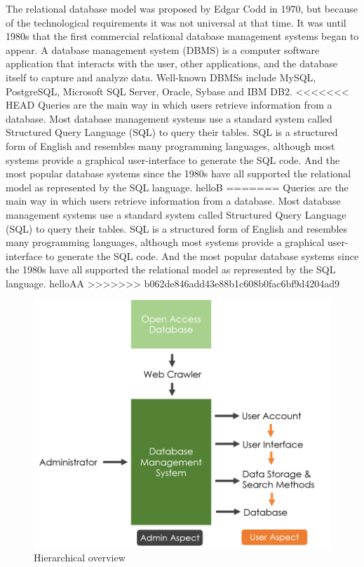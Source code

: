 The relational database model was proposed by Edgar Codd in 1970, but because of the technological requirements it was not universal at that time. It was until 1980s that the first commercial relational database management systems began to appear. 
A database management system (DBMS) is a computer software application that interacts with the user, other applications, and the database itself to capture and analyze data. Well-known DBMSs include MySQL, PostgreSQL, Microsoft SQL Server, Oracle, Sybase and IBM DB2. 
<<<<<<< HEAD
Queries are the main way in which users retrieve information from a database. Most database management systems use a standard system called Structured Query Language (SQL) to query their tables. SQL is a structured form of English and resembles many programming languages, although most systems provide a graphical user-interface to generate the SQL code. And the most popular database systems since the 1980s have all supported the relational model as represented by the SQL language.\cite{Martinez-Cruz2011} helloB	
=======
Queries are the main way in which users retrieve information from a database. Most database management systems use a standard system called Structured Query Language (SQL) to query their tables. SQL is a structured form of English and resembles many programming languages, although most systems provide a graphical user-interface to generate the SQL code. And the most popular database systems since the 1980s have all supported the relational model as represented by the SQL language.\cite{Martinez-Cruz2011} helloAA
>>>>>>> b062de846add43e88b1c608b0fac6bf9d4204ad9
	
\begin{figure}[h]
	\begin{center}
		\includegraphics[scale=1.0]{WolverineChart}
	\end{center}
	\caption{Hierarchical overview}
\end{figure}
\clearpage
